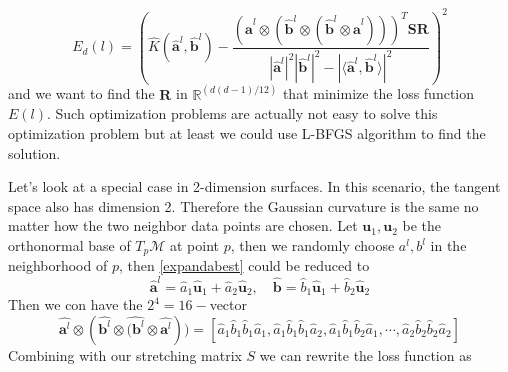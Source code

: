 \documentclass{article}
\begin{document}
\begin{equation}
	E_d(l)= \left(\widehat{K}(\widehat{\boldsymbol{a}}^l,\widehat{\boldsymbol{b}}^l)-\frac{(\widehat{\boldsymbol{a}}^l\otimes(\widehat{\boldsymbol{b}}^l\otimes(\widehat{\boldsymbol{b}}^l\otimes\widehat{\boldsymbol{a}}^l)))^T\boldsymbol{S}\boldsymbol{R}}{|\widehat{\boldsymbol{a}}^l|^2|\widehat{\boldsymbol{b}}^l|^2-|\langle \widehat{\boldsymbol{a}}^l,\widehat{\boldsymbol{b}}^l\rangle|^2}\right)^2
	\label{loss2}
\end{equation}
and we want to find the $\boldsymbol{R}$ in $\mathbb{R}^{(d(d-1)/12)}$ that minimize the loss function $E(l)$. Such optimization problems are actually not easy to solve this optimization problem but at least we could use L-BFGS algorithm to find the solution.
\par
Let's look at a special case in  2-dimension surfaces. In this scenario, the tangent space also has dimension 2. Therefore the Gaussian curvature is the same no matter how the two neighbor data points are chosen. Let $\boldsymbol{u}_1,\boldsymbol{u}_2$ be the orthonormal base of $T_p\mathcal{M}$ at point $p$, then we randomly choose $a^l,b^l$ in the neighborhood of $p$, then \ref{expandabest} could be reduced to 
\begin{equation}
	\widehat{\boldsymbol{a}}^l=\widehat{a}_1\widehat{\boldsymbol{u}}_1+\widehat{a}_2\widehat{\boldsymbol{u}}_2,\quad \widehat{\boldsymbol{b}}=\widehat{b}_1\widehat{\boldsymbol{u}}_1+\widehat{b}_2\widehat{\boldsymbol{u}}_2
\end{equation}
Then we con have the $2^4=16-$vector
\begin{equation}
	\widehat{\boldsymbol{a}^l}\otimes(\widehat{\boldsymbol{b}^l}\otimes\widehat{(\boldsymbol{b}^l}\otimes\widehat{\boldsymbol{a}^l}))=[\widehat{a}_1\widehat{b}_1\widehat{b}_1\widehat{a}_1,\widehat{a}_1\widehat{b}_1\widehat{b}_1\widehat{a}_2,\widehat{a}_1\widehat{b}_1\widehat{b}_2\widehat{a}_1,\cdots,\widehat{a}_2\widehat{b}_2\widehat{b}_2\widehat{a}_2]
\end{equation}
Combining with our stretching matrix $S$ we can rewrite the loss function as
\end{document}
